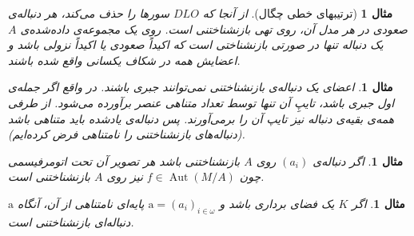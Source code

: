 \documentclass[12pt,a4paper]{report}
\theoremstyle{colorhead}
\newtheorem{mesal}[thm]{مثال}
\DeclareMathOperator{\Aut}{Aut}
\begin{document}
\begin{mesal}[ترتیبهای خطی چگال]
از آنجا که
$DLO$
سورها را حذف می‌کند، هر دنباله‌ی صعودی در هر مدل آن، روی
تهی بازنشناختنی است. روی یک مجموعه‌ی داده‌شده‌ی
$A$
یک دنباله تنها در صورتی بازنشناختی است که اکیداً صعودی یا اکیداً نزولی باشد و اعضایش همه در شکاف یکسانی واقع شده‌ باشند. 
\end{mesal}
\begin{mesal}
اعضای یک دنباله‌ی بازنشناختنی نمی‌توانند جبری باشند. در واقع اگر
جمله‌ی اول جبری باشد، تایپِ آن تنها توسط تعداد متناهی عنصر برآورده می‌شود. از طرفی همه‌ی بقیه‌ی دنباله نیز تایپ آن را برمی‌آورند. پس دنباله‌ی یادشده باید متناهی باشد (دنباله‌های بازنشناختنی را نامتناهی فرض کرده‌ایم).
\end{mesal}
\begin{mesal}
اگر
دنباله‌ی
$(a_i)$
روی
$A$
بازنشناختنی باشد هر تصویر آن تحت اتومرفیسمی چون
\mbox{$f\in \Aut(M/A)$}
نیز روی
$A$
بازنشناختنی است.
\end{mesal}
\begin{mesal}
اگر
$K$
یک فضای برداری باشد و 
$\mathrm{a}=(a_i)_{i\in \omega}$
پایه‌ای نامتناهی از آن، آنگاه 
$\mathrm{a}$
دنباله‌ای بازنشناختنی است. 
\end{mesal}
\end{document}
